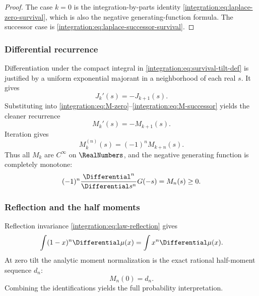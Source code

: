 \documentclass[11pt,oneside]{article}
\theoremstyle{definition}
\theoremstyle{remark}
\begin{document}
\begin{proof}
The case $k=0$ is the integration-by-parts identity
\eqref{integration:eq:laplace-zero-survival}, which is also the negative generating-function formula.
The successor case is \eqref{integration:eq:laplace-successor-survival}.
\end{proof}

\subsubsection{Differential recurrence}

Differentiation under the compact integral in \eqref{integration:eq:survival-tilt-def} is justified by a
uniform exponential majorant in a neighborhood of each real $s$.  It gives
\begin{equation}
 J_k'(s)=-J_{k+1}(s).
 \label{integration:eq:J-differential-recurrence}
\end{equation}
Substituting into \eqref{integration:eq:M-zero}--\eqref{integration:eq:M-successor} yields the cleaner recurrence
\begin{equation}
 M_k'(s)=-M_{k+1}(s).
 \label{integration:eq:M-differential-recurrence}
\end{equation}
Iteration gives
\begin{equation}
 M_k^{(n)}(s)=(-1)^nM_{k+n}(s).
 \label{integration:eq:M-iterated-derivative}
\end{equation}
Thus all $M_k$ are $C^\infty$ on $\RealNumbers$, and the negative generating function is completely
monotone:
\begin{equation}
 (-1)^n\frac{\Differential^n}{\Differential s^n}G(-s)=M_n(s)\ge0.
 \label{integration:eq:complete-monotonicity}
\end{equation}

\subsubsection{Reflection and the half moments}

Reflection invariance \eqref{integration:eq:law-reflection} gives
\begin{equation}
 \int(1-x)^n\Differential\mu(x)=\int x^n\Differential\mu(x).
 \label{integration:eq:endpoint-raw-reflection}
\end{equation}
At zero tilt the analytic moment normalization is the exact rational half-moment sequence
$d_n$:
\begin{equation}
 M_n(0)=d_n.
 \label{integration:eq:M-zero-half-moment}
\end{equation}
Combining the identifications yields the full probability interpretation.
\end{document}
